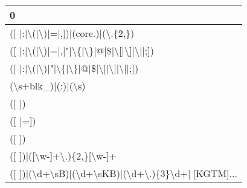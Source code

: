 \begin{tabular}{l}
\toprule
                                                 0 \\
\midrule
                ([ |:|\textbackslash (|\textbackslash )|=|,])|(core.)|(\textbackslash .\{2,\}) \\
          ([ |:|\textbackslash (|\textbackslash )|=|,|"|\textbackslash \{|\textbackslash \}|@|\$|\textbackslash [|\textbackslash ]|\textbackslash ||;]) \\
              ([ |:|\textbackslash (|\textbackslash )|"|\textbackslash \{|\textbackslash \}|@|\$|\textbackslash [|\textbackslash ]|\textbackslash ||;]) \\
                                (\textbackslash s+blk\_)|(:)|(\textbackslash s) \\
                                             ([ ]) \\
                                           ([ |=]) \\
                                             ([ ]) \\
                        ([ ])|([\textbackslash w-]+\textbackslash .)\{2,\}[\textbackslash w-]+ \\
 ([ ])|(\textbackslash d+\textbackslash sB)|(\textbackslash d+\textbackslash sKB)|(\textbackslash d+\textbackslash .)\{3\}\textbackslash d+|[KGTM]... \\
\bottomrule
\end{tabular}
